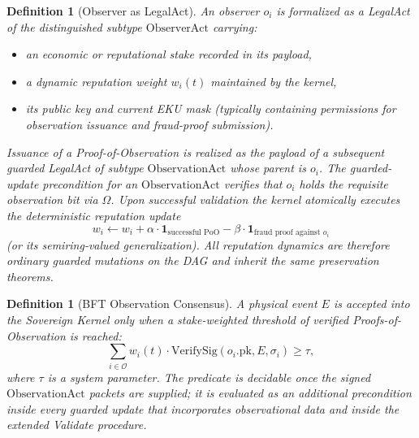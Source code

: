 \documentclass[11pt,a4paper]{article}
\newtheorem{definition}[theorem]{Definition}
\begin{document}
\begin{definition}[Observer as LegalAct]
An observer \(o_i\) is formalized as a LegalAct of the distinguished subtype \(\mathrm{ObserverAct}\) carrying:

\begin{itemize}
\item an economic or reputational stake recorded in its payload,

\item a dynamic reputation weight \(w_i(t)\) maintained by the kernel,

\item its public key and current EKU mask (typically containing permissions for observation issuance and fraud-proof submission).

\end{itemize}

Issuance of a Proof-of-Observation is realized as the payload of a subsequent guarded LegalAct of subtype \(\mathrm{ObservationAct}\) whose parent is \(o_i\). The guarded-update precondition for an \(\mathrm{ObservationAct}\) verifies that \(o_i\) holds the requisite observation bit via \(\Omega\). Upon successful validation the kernel atomically executes the deterministic reputation update
\[
w_i \leftarrow w_i + \alpha\cdot\mathbf{1}_{\text{successful PoO}} - \beta\cdot\mathbf{1}_{\text{fraud proof against }o_i}
\]
(or its semiring-valued generalization). All reputation dynamics are therefore ordinary guarded mutations on the DAG and inherit the same preservation theorems.
\end{definition}

\begin{definition}[BFT Observation Consensus]
A physical event \(E\) is accepted into the Sovereign Kernel only when a stake-weighted threshold of verified Proofs-of-Observation is reached:
\[
\sum_{i\in\mathcal{O}} w_i(t)\cdot\mathrm{VerifySig}(o_i.\mathrm{pk},E,\sigma_i)\ge\tau,
\]
where \(\tau\) is a system parameter. The predicate is decidable once the signed \(\mathrm{ObservationAct}\) packets are supplied; it is evaluated as an additional precondition inside every guarded update that incorporates observational data and inside the extended Validate procedure.
\end{definition}
\end{document}
